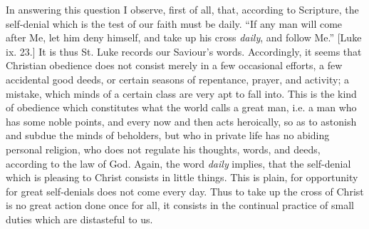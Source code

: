 In answering this question I observe, first of all,
that, according to Scripture, the self-denial which is
the test of our faith must be daily. ``If any man
will come after Me, let him deny himself, and take up his
cross \emph{daily}, and follow Me.'' [Luke ix. 23.]
It is thus St. Luke records our Saviour's words.
Accordingly, it seems that Christian obedience does not
consist merely in a few occasional efforts, a few
accidental good deeds, or certain seasons of repentance,
prayer, and activity; a mistake, which minds of a certain
class are very apt to fall into. This is the kind of
obedience which constitutes what the world calls a great
man, i.e. a man who has some noble points, and every now
and then acts heroically, so as to astonish and subdue
the minds of beholders, but who in private life has no
abiding personal religion, who does not regulate his
thoughts, words, and deeds, according to the law of God.
Again, the word \emph{daily} implies, that the
self-denial which is pleasing to Christ consists in
little things. This is plain, for opportunity for great
self-denials does not come every day. Thus to take up the
cross of Christ is no great action done once for all, it
consists in the continual practice of small duties which
are distasteful to us.


